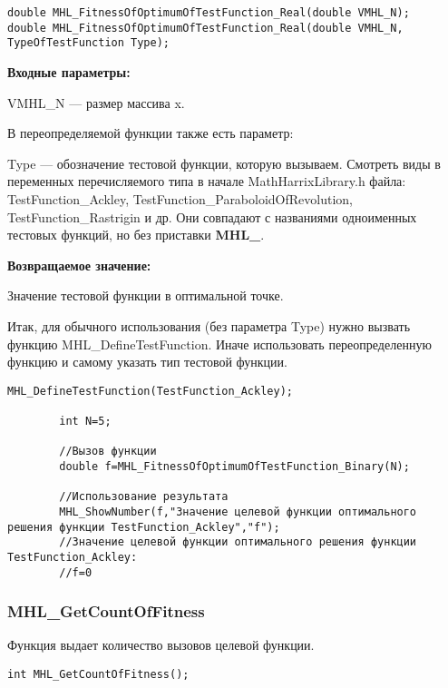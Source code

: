 \documentclass[a4paper,12pt]{article}
\begin{document}
\begin{lstlisting}[label=code_syntax_MHL_FitnessOfOptimumOfTestFunction_Real,caption=Синтаксис]
double MHL_FitnessOfOptimumOfTestFunction_Real(double VMHL_N);
double MHL_FitnessOfOptimumOfTestFunction_Real(double VMHL_N, TypeOfTestFunction Type);
\end{lstlisting}

\textbf{Входные параметры:}

VMHL\_N --- размер массива x.

В переопределяемой функции также есть параметр:
  
Type --- обозначение тестовой функции, которую вызываем.
Смотреть виды в переменных перечисляемого типа в начале MathHarrixLibrary.h файла: TestFunction\_Ackley, TestFunction\_ParaboloidOfRevolution, TestFunction\_Rastrigin и др. Они совпадают с названиями одноименных тестовых функций, но без приставки \textbf{MHL\_}.

\textbf{Возвращаемое значение:}
 
Значение тестовой функции в оптимальной точке.

Итак, для обычного использования (без параметра Type) нужно вызвать функцию MHL\_DefineTestFunction. Иначе использовать переопределенную функцию и самому указать тип тестовой функции.


\begin{lstlisting}[label=code_use_MHL_FitnessOfOptimumOfTestFunction_Real,caption=Пример использования]
        MHL_DefineTestFunction(TestFunction_Ackley);

        int N=5;

        //Вызов функции
        double f=MHL_FitnessOfOptimumOfTestFunction_Binary(N);

        //Использование результата
        MHL_ShowNumber(f,"Значение целевой функции оптимального решения функции TestFunction_Ackley","f");
        //Значение целевой функции оптимального решения функции TestFunction_Ackley:
        //f=0
\end{lstlisting}

\subsubsection{MHL\_GetCountOfFitness}\label{MHL_GetCountOfFitness}

Функция выдает количество вызовов целевой функции.


\begin{lstlisting}[label=code_syntax_MHL_GetCountOfFitness,caption=Синтаксис]
int MHL_GetCountOfFitness();
\end{lstlisting}
\end{document}
